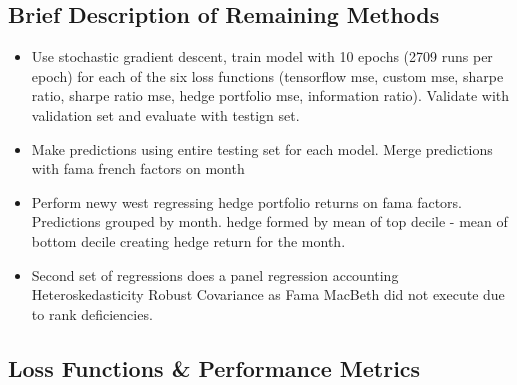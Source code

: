 \documentclass[12pt]{article}
\begin{document}
{\subsection{Brief Description of Remaining Methods}
\begin{itemize}
	\item Use stochastic gradient descent, train model with 10 epochs (2709 runs per epoch) for each of the six loss functions (tensorflow mse, custom mse, sharpe ratio, sharpe ratio mse, hedge portfolio mse, information ratio). Validate with validation set and evaluate with testign set.
	\item Make predictions using entire testing set for each model. Merge predictions with fama french factors on month
	\item Perform newy west regressing hedge portfolio returns on fama factors. Predictions grouped by month. hedge formed by mean of top decile - mean of bottom decile creating hedge return for the month.
	\item Second set of regressions does a panel regression  accounting Heteroskedasticity Robust Covariance as Fama MacBeth did not execute due to rank deficiencies.
\end{itemize}
\subsection{Loss Functions \& Performance Metrics}
}
\end{document}
